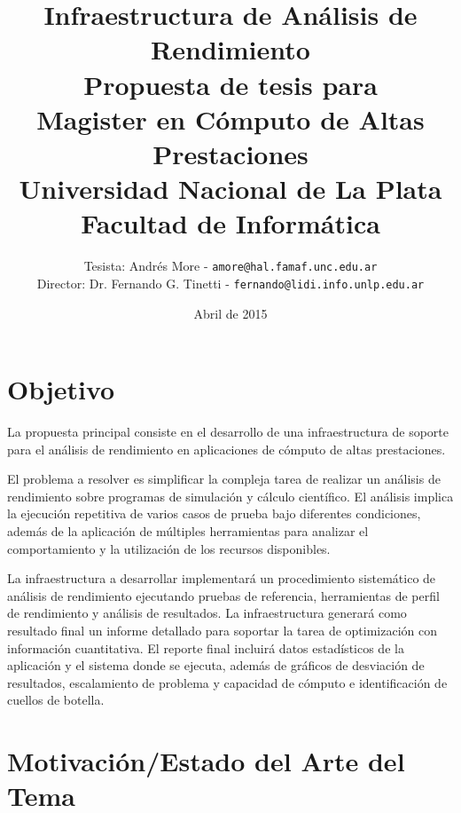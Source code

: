\documentclass[a4paper]{article}
\begin{document}
\title{Infraestructura de Análisis de Rendimiento\\
\bigskip
{\large Propuesta de tesis para\\} Magister en Cómputo de Altas Prestaciones\\
\bigskip
Universidad Nacional de La Plata\\
Facultad de Informática\\
\bigskip
}

\author{Tesista: Andrés More - {\tt amore@hal.famaf.unc.edu.ar}\\
Director: Dr. Fernando G. Tinetti - {\tt fernando@lidi.info.unlp.edu.ar}}

\date{Abril de 2015}

\maketitle

\newpage

\section{Objetivo}

La propuesta principal consiste en el desarrollo de una infraestructura de soporte para el análisis de rendimiento en aplicaciones de cómputo de altas prestaciones.

\bigskip

El problema a resolver es simplificar la compleja tarea de realizar un análisis de rendimiento sobre programas de simulación y cálculo científico. El análisis implica la ejecución repetitiva de varios casos de prueba bajo diferentes condiciones, además de la aplicación de múltiples herramientas para analizar el comportamiento y la utilización de los recursos disponibles.

\bigskip

La infraestructura a desarrollar implementará un procedimiento sistemático de análisis de rendimiento ejecutando pruebas de referencia, herramientas de perfil de rendimiento y análisis de resultados.  La infraestructura generará como resultado final un informe detallado para soportar la tarea de optimización con información cuantitativa. El reporte final incluirá datos estadísticos de la aplicación y el sistema donde se ejecuta, además de gráficos de desviación de resultados, escalamiento de problema y capacidad de cómputo e identificación de cuellos de botella.

\section{Motivación/Estado del Arte del Tema}
\end{document}
